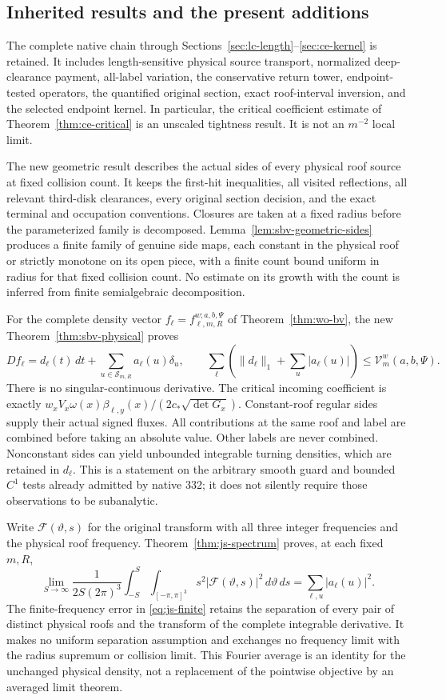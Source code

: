 \subsection*{Inherited results and the present additions}
The complete native chain through
Sections~\ref{sec:lc-length}--\ref{sec:ce-kernel} is retained.
It includes length-sensitive physical source transport,
normalized deep-clearance payment, all-label variation,
the conservative return tower, endpoint-tested operators,
the quantified original section, exact roof-interval inversion,
and the selected endpoint kernel. In particular, the critical
coefficient estimate of Theorem~\ref{thm:ce-critical} is an
unscaled tightness result. It is not an $m^{-2}$ local limit.

The new geometric result describes the actual sides of every
physical roof source at fixed collision count. It keeps the
first-hit inequalities, all visited reflections, all relevant
third-disk clearances, every original section decision, and
the exact terminal and occupation conventions. Closures are
taken at a fixed radius before the parameterized family is
decomposed. Lemma~\ref{lem:sbv-geometric-sides} produces a
finite family of genuine side maps, each constant in the
physical roof or strictly monotone on its open piece, with
a finite count bound uniform in radius for that fixed
collision count. No estimate on its growth with the count
is inferred from finite semialgebraic decomposition.

For the complete density vector
$f_\ell=f^{w;a,b,\Psi}_{\ell,m,R}$ of
Theorem~\ref{thm:wo-bv}, the new
Theorem~\ref{thm:sbv-physical} proves
\[
 Df_\ell=d_\ell(t)\,dt+
                  \sum_{u\in\mathcal S_{m,R}}a_\ell(u)\delta_u,
 \qquad
 \sum_\ell\left(\|d_\ell\|_1+\sum_u|a_\ell(u)|\right)
                  \le\mathcal V_m^w(a,b,\Psi).
\]
There is no singular-continuous derivative. The critical
incoming coefficient is exactly
$w_xV_x\omega(x)\beta_{\ell,y}(x)/
(2c_*\sqrt{\det G_x})$.
Constant-roof regular sides supply their actual signed fluxes.
All contributions at the same roof and label are combined
before taking an absolute value. Other labels are never
combined. Nonconstant sides can yield unbounded integrable
turning densities, which are retained in $d_\ell$.
This is a statement on the arbitrary smooth guard and
bounded $C^1$ tests already admitted by native 332; it does
not silently require those observations to be subanalytic.

Write $\mathcal F(\vartheta,s)$ for the original transform
with all three integer frequencies and the physical roof
frequency. Theorem~\ref{thm:js-spectrum} proves, at each
fixed $m,R$,
\[
 \lim_{S\to\infty}\frac1{2S(2\pi)^3}
  \int_{-S}^S\int_{[-\pi,\pi]^3}
          s^2|\mathcal F(\vartheta,s)|^2\,d\vartheta\,ds
             =\sum_{\ell,u}|a_\ell(u)|^2.
\]
The finite-frequency error in \eqref{eq:js-finite} retains
the separation of every pair of distinct physical roofs
and the transform of the complete integrable derivative.
It makes no uniform separation assumption and exchanges
no frequency limit with the radius supremum or collision
limit. This Fourier average is an identity for the
unchanged physical density, not a replacement of the
pointwise objective by an averaged limit theorem.

